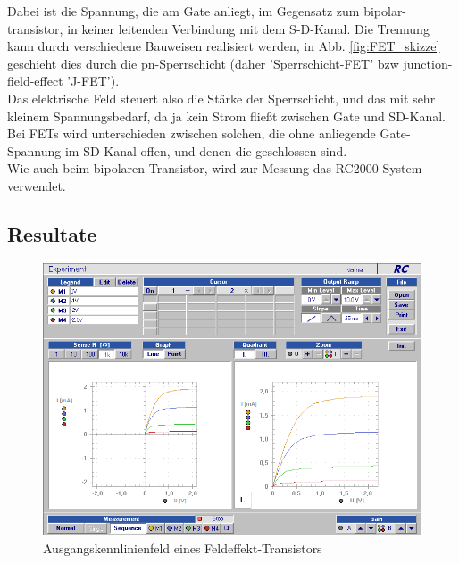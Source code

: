 \documentclass[12pt,a4paper]{article}
\begin{document}
\begin{multicols}{2}

Dabei ist die Spannung, die am Gate anliegt, im Gegensatz zum bipolar-transistor, in keiner leitenden Verbindung mit dem S-D-Kanal. Die Trennung kann durch verschiedene Bauweisen realisiert werden, in Abb. \ref{fig:FET_skizze} geschieht dies durch die pn-Sperrschicht (daher 'Sperrschicht-FET' bzw junction-field-effect 'J-FET').\\
Das elektrische Feld steuert also die Stärke der Sperrschicht, und das mit sehr kleinem Spannungsbedarf, da ja kein Strom fließt zwischen Gate und SD-Kanal.\\
Bei FETs wird unterschieden zwischen solchen, die ohne anliegende Gate-Spannung im SD-Kanal offen, und denen die geschlossen sind.\\

Wie auch beim bipolaren Transistor, wird zur Messung das RC2000-System verwendet.



\subsection{Resultate}

\begin{figure}[H]
	\centering
	\includegraphics[scale=0.45]{./data/Braun_Kurz_PS8/FET_Ausgangskennlinien.png}
	\caption{Ausgangskennlinienfeld eines Feldeffekt-Transistors}
	\label{fig:ausgangskennlinienfeld_fet}
\end{figure}


\end{multicols}
\end{document}
